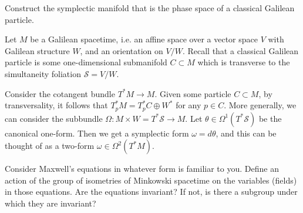 \documentclass{pset}
\begin{document}
\begin{problem}{4}
  Construct the symplectic manifold that is the phase space of a classical Galilean particle.
\end{problem}

\begin{solution}
  Let $M$ be a Galilean spacetime, i.e. an affine space over a vector space $V$ with Galilean structure $W$, and an orientation on $V/W$. Recall that a classical Galilean particle is some one-dimensional submanifold $C\subset M$ which is transverse to the simultaneity foliation $\mathcal{S}=V/W$.

  Consider the cotangent bundle $T^*M \to M$. Given some particle $C\subset M$, by transversality, it follows that $T_p^*M = T_p^*C\oplus W^*$ for any $p\in C$. More generally, we can consider the subbundle $\Omega : M\times W=T^* \mathcal{S} \to M$. Let $\theta \in \Omega^1(T^*\mathcal{S})$ be the canonical one-form. Then we get a symplectic form $\omega = d\theta$, and this can be thought of as a two-form $\omega\in \Omega^2(T^* M)$.
\end{solution}

\begin{problem}{6}
  Consider Maxwell’s equations in whatever form is familiar to you. Define an action of the group of isometries of Minkowski spacetime on the variables (fields) in those equations. Are the equations invariant? If not, is there a subgroup under which they are invariant?
\end{problem}
\end{document}
